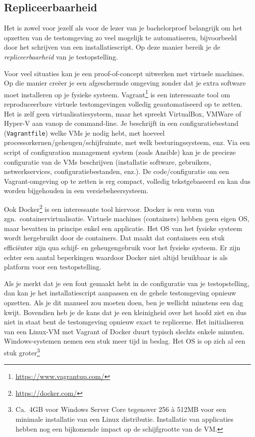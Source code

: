 \subsection{Repliceerbaarheid}
\label{ssec:repliceerbaarheid}

Het is zowel voor jezelf als voor de lezer van je bachelorproef belangrijk om het opzetten van de testomgeving zo veel mogelijk te automatiseren, bijvoorbeeld door het schrijven van een installatiescript. Op deze manier bereik je de \textit{repliceerbaarheid} van je testopstelling.

Voor veel situaties kan je een proof-of-concept uitwerken met virtuele machines. Op die manier creëer je een afgeschermde omgeving zonder dat je extra software moet installeren op je fysieke systeem. Vagrant\footnote{\url{https://www.vagrantup.com/}} is een interessante tool om reproduceerbare virtuele testomgevingen volledig geautomatiseerd op te zetten. Het is zelf geen virtualisatiesysteem, maar het spreekt VirtualBox, VMWare of Hyper-V aan vanop de command-line. Je beschrijft in een configuratiebestand (\texttt{Vagrantfile}) welke VMs je nodig hebt, met hoeveel processorkernen/geheugen/schijfruimte, met welk besturingssysteem, enz. Via een script of configuration management system (zoals Ansible) kan je de precieze configuratie van de VMs beschrijven (installatie software, gebruikers, netwerkservices, configuratiebestanden, enz.). De code/configuratie om een Va\-grant-\-omgeving op te zetten is erg compact, volledig tekstgebaseerd en kan dus worden bijgehouden in een versiebeheersysteem.

Ook Docker\footnote{\url{https://docker.com/}} is een interessante tool hiervoor. Docker is een vorm van zgn.~containervirtualisatie. Virtuele machines (containers) hebben geen eigen OS, maar bevatten in principe enkel een applicatie. Het OS van het fysieke systeem wordt hergebruikt door de containers. Dat maakt dat containers een stuk efficiënter zijn qua schijf- en geheugengebruik voor het fysieke systeem. Er zijn echter een aantal beperkingen waardoor Docker niet altijd bruikbaar is als platform voor een testopstelling.

Als je merkt dat je een fout gemaakt hebt in de configuratie van je testopstelling, dan kan je het installatiescript aanpassen en de gehele testomgeving opnieuw opzetten. Als je dit manueel zou moeten doen, ben je wellicht minstens een dag kwijt. Bovendien heb je de kans dat je een kleinigheid over het hoofd ziet en dus niet in staat bent de testomgeving opnieuw exact te replicerne. Het initialiseren van een Linux-VM met Vagrant of Docker duurt typisch slechts enkele minuten. Windows-systemen nemen een stuk meer tijd in beslag. Het OS is op zich al een stuk groter\footnote{Ca.~4GB voor Windows Server Core tegenover 256 à 512MB voor een minimale installatie van een Linux distributie. Installatie van applicaties hebben nog een bijkomende impact op de schijfgrootte van de VM.}

